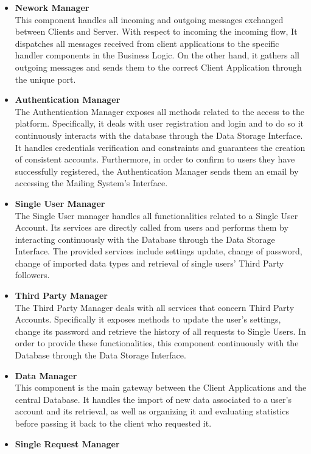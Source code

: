\documentclass[titlepage]{article}
\begin{document}
\begin{itemize}
        \item {\bf Nework Manager }\\
        This component handles all incoming and outgoing messages exchanged between Clients and Server. With respect to incoming the incoming flow, It dispatches all messages received from client applications to the specific handler components in the Business Logic. On the other hand, it gathers all outgoing messages and sends them to the correct Client Application through the unique port.
		\item {\bf Authentication Manager }\\
		The Authentication Manager exposes all methods related to the access to the platform. Specifically, it deals with user registration and login and to do so it continuously interacts with the database through the Data Storage Interface. It handles credentials verification and constraints and guarantees the creation of consistent accounts. Furthermore, in order to confirm to users they have successfully registered, the Authentication Manager sends them an email by accessing the Mailing System’s Interface.
		\item {\bf Single User Manager }\\
		The Single User manager handles all functionalities related to a Single User Account. Its services are directly called from users and performs them by interacting continuously with the Database through the Data Storage Interface. The provided services include settings update, change of password, change of imported data types and retrieval of single users’ Third Party followers.
		\item {\bf Third Party Manager }\\
		The Third Party Manager deals with all services that concern Third Party Accounts. Specifically it exposes methods to update the user’s settings, change its password and retrieve the history of all requests to Single Users. In order to provide these functionalities, this component continuously with the Database through the Data Storage Interface.
		\item {\bf Data Manager }\\
		This component is the main gateway between the Client Applications and the central Database. It handles the import of new data associated to a user’s account and its retrieval, as well as organizing it and evaluating statistics before passing it back to the client who requested it.
		\item {\bf Single Request Manager }\\

\end{itemize}
\end{document}
